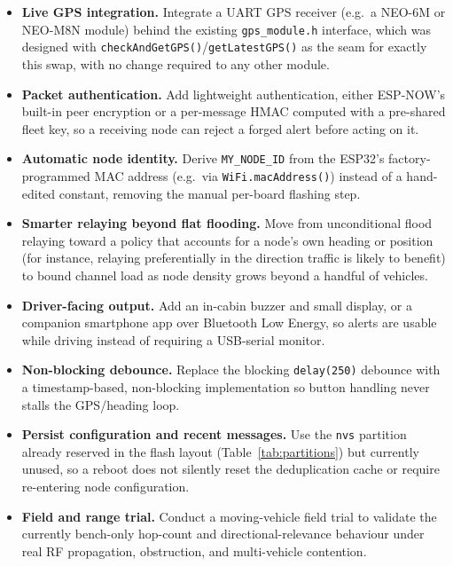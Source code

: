 \documentclass[12pt,a4paper]{report}
\begin{document}
\begin{itemize}[leftmargin=1.6em]
\item \textbf{Live GPS integration.} Integrate a UART GPS receiver (e.g.\ a NEO-6M or NEO-M8N module) behind the existing \texttt{gps\_module.h} interface, which was designed with \texttt{checkAndGetGPS()}/\texttt{getLatestGPS()} as the seam for exactly this swap, with no change required to any other module.

\item \textbf{Packet authentication.} Add lightweight authentication, either ESP-NOW's built-in peer encryption or a per-message HMAC computed with a pre-shared fleet key, so a receiving node can reject a forged alert before acting on it.

\item \textbf{Automatic node identity.} Derive \texttt{MY\_NODE\_ID} from the ESP32's factory-programmed MAC address (e.g.\ via \texttt{WiFi.macAddress()}) instead of a hand-edited constant, removing the manual per-board flashing step.

\item \textbf{Smarter relaying beyond flat flooding.} Move from unconditional flood relaying toward a policy that accounts for a node's own heading or position (for instance, relaying preferentially in the direction traffic is likely to benefit) to bound channel load as node density grows beyond a handful of vehicles.

\item \textbf{Driver-facing output.} Add an in-cabin buzzer and small display, or a companion smartphone app over Bluetooth Low Energy, so alerts are usable while driving instead of requiring a USB-serial monitor.

\item \textbf{Non-blocking debounce.} Replace the blocking \texttt{delay(250)} debounce with a timestamp-based, non-blocking implementation so button handling never stalls the GPS/heading loop.

\item \textbf{Persist configuration and recent messages.} Use the \texttt{nvs} partition already reserved in the flash layout (Table~\ref{tab:partitions}) but currently unused, so a reboot does not silently reset the deduplication cache or require re-entering node configuration.

\item \textbf{Field and range trial.} Conduct a moving-vehicle field trial to validate the currently bench-only hop-count and directional-relevance behaviour under real RF propagation, obstruction, and multi-vehicle contention.
\end{itemize}
\end{document}
